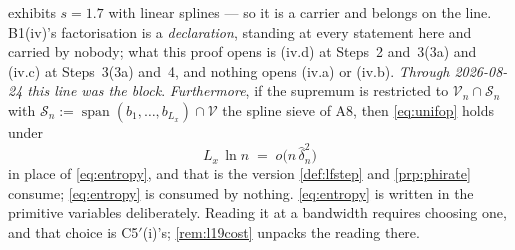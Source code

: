 \begin{lemma}
exhibits $s=1.7$ with linear splines --- so it is a carrier and belongs on the line. B1(iv)'s
factorisation is a \emph{declaration}, standing at every statement here and carried by nobody; what this
proof opens is \textup{(iv.d)} at Steps~2 and~3(3a) and \textup{(iv.c)} at Steps~3(3a) and~4, and
nothing opens \textup{(iv.a)} or \textup{(iv.b)}. \emph{Through 2026-08-24 this line was the block}.
\emph{Furthermore}, if the supremum is restricted to
$\mathcal V_n\cap\mathcal S_n$ with $\mathcal S_n:=\operatorname{span}(b_1,\dots,b_{L_x})\cap\mathcal V$
the spline sieve of A8, then \eqref{eq:unifop} holds under
\begin{equation}\label{eq:entropysieve}
L_x\,\ln n\;=\;o\big(n\,\hat\delta_n^{2}\big)
\end{equation}
in place of \eqref{eq:entropy}, and that is the version \cref{def:lfstep} and
\cref{prp:phirate} consume; \eqref{eq:entropy} is consumed by nothing.
\eqref{eq:entropy} is written in the primitive variables deliberately. Reading it at a bandwidth
requires choosing one, and that choice is C5$'$(i)'s; \cref{rem:l19cost} unpacks the reading there.


\end{lemma}
